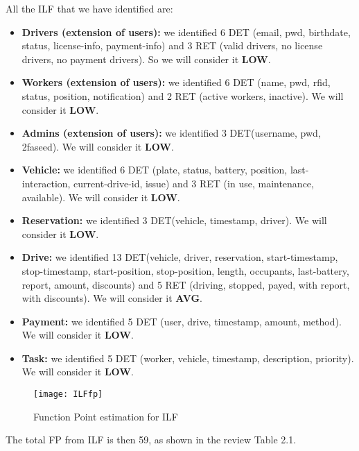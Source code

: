 All the ILF that we have identified are:
\begin{itemize}
\item \textbf{Drivers (extension of users):} we identified 6 DET (email, pwd, birthdate, status, license-info, payment-info) and 3 RET (valid drivers, no license drivers, no payment drivers). So we will consider it \textbf{LOW}.
\item \textbf{Workers (extension of users):} we identified 6 DET (name, pwd, rfid, status, position, notification) and 2 RET (active workers, inactive). We will consider it \textbf{LOW}.
\item \textbf{Admins (extension of users):} we identified 3 DET(username, pwd, 2faseed). We will consider it \textbf{LOW}.
\item \textbf{Vehicle:} we identified 6 DET (plate, status, battery, position, last-interaction, current-drive-id, issue) and 3 RET (in use, maintenance, available). We will consider it \textbf{LOW}.
\item \textbf{Reservation:} we identified 3 DET(vehicle, timestamp, driver). We will consider it \textbf{LOW}.
\item \textbf{Drive:} we identified 13 DET(vehicle, driver, reservation, start-timestamp, stop-timestamp, start-position, stop-position, length, occupants, last-battery, report, amount, discounts) and 5 RET (driving, stopped, payed, with report, with discounts). We will consider it \textbf{AVG}.
\item \textbf{Payment:} we identified 5 DET (user, drive, timestamp, amount, method). We will consider it \textbf{LOW}.
\item \textbf{Task:} we identified 5 DET (worker, vehicle, timestamp, description, priority). We will consider it \textbf{LOW}.
\end{itemize}

\begin{figure}
  \centering
  \texttt{[image: ILFfp]}
  \caption{Function Point estimation for ILF}
\end{figure}

The total FP from ILF is then 59, as shown in the review Table 2.1. 

\clearpage

